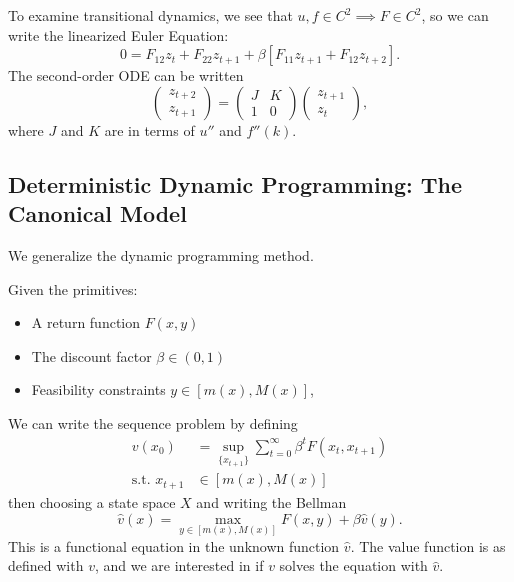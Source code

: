 \documentclass{tufte-handout}
\theoremstyle{definition}
\begin{document}
To examine transitional dynamics, we see that $u,f \in C^2 \implies F \in C^2$, so we can write the linearized Euler Equation: \[
	0 = F_{12}z_t + F_{22}z_{t+1} + \beta\left[ F_{11} z_{t+1} + F_{12} z_{t+2} \right] 
.\] 
The second-order ODE can be written \[
	\begin{pmatrix}
	z_{t+2} \\
	z_{t+1}
	\end{pmatrix} = \begin{pmatrix}
	J & K \\
	1 & 0
	\end{pmatrix} \begin{pmatrix}
	z_{t+1} \\
	z_t
	\end{pmatrix} 
,\] where $J$ and $K$ are in terms of $u''$ and $f''(k)$.

\subsection{Deterministic Dynamic Programming: The Canonical Model}

We generalize the dynamic programming method.

Given the primitives:
\begin{itemize}
	\item A return function $F(x,y)$ 
	\item The discount factor $\beta \in (0,1)$ 
	\item Feasibility constraints $y \in \left[ m(x),M(x) \right] $,
\end{itemize}

We can write the sequence problem by defining
\begin{align*}
	v(x_0) &= \sup\limits_{\{x_{t+1}\}} \sum\limits_{t=0}^{\infty} \beta^t F(x_t,x_{t+1}) \\
	\text{s.t. } x_{t+1} &\in \left[ m(x), M(x) \right] 
\end{align*}
then choosing a state space $X$ and writing the Bellman \[
	\hat{v}(x) = \max_{y \in [m(x), M(x)]} F(x,y) + \beta \hat{v}(y)
.\] 
This is a functional equation in the unknown function $\hat{v}$. The value function is as defined with $v$, and we are interested in if $v$ solves the equation with $\hat{v}$. 
\end{document}
